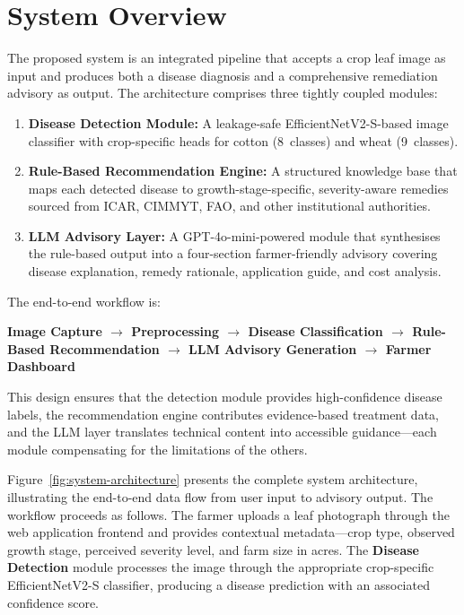 \documentclass[12pt,a4paper]{report}
\begin{document}
\section{System Overview}
The proposed system is an integrated pipeline that accepts a crop leaf image as input and produces both a disease diagnosis and a comprehensive remediation advisory as output. The architecture comprises three tightly coupled modules:

\begin{enumerate}
    \item \textbf{Disease Detection Module:} A leakage-safe EfficientNetV2-S-based image classifier with crop-specific heads for cotton (8~classes) and wheat (9~classes).
    \item \textbf{Rule-Based Recommendation Engine:} A structured knowledge base that maps each detected disease to growth-stage-specific, severity-aware remedies sourced from ICAR, CIMMYT, FAO, and other institutional authorities.
    \item \textbf{LLM Advisory Layer:} A GPT-4o-mini-powered module that synthesises the rule-based output into a four-section farmer-friendly advisory covering disease explanation, remedy rationale, application guide, and cost analysis.
\end{enumerate}

The end-to-end workflow is:
\begin{center}
\textbf{Image Capture $\rightarrow$ Preprocessing $\rightarrow$ Disease Classification $\rightarrow$ Rule-Based Recommendation $\rightarrow$ LLM Advisory Generation $\rightarrow$ Farmer Dashboard}
\end{center}

This design ensures that the detection module provides high-confidence disease labels, the recommendation engine contributes evidence-based treatment data, and the LLM layer translates technical content into accessible guidance---each module compensating for the limitations of the others.

Figure~\ref{fig:system-architecture} presents the complete system architecture, illustrating the end-to-end data flow from user input to advisory output. The workflow proceeds as follows. The farmer uploads a leaf photograph through the web application frontend and provides contextual metadata---crop type, observed growth stage, perceived severity level, and farm size in acres. The \textbf{Disease Detection} module processes the image through the appropriate crop-specific EfficientNetV2-S classifier, producing a disease prediction with an associated confidence score.
\end{document}
